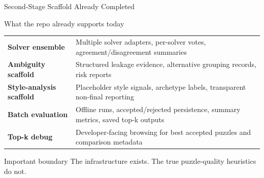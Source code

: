 \documentclass[11pt,aspectratio=169]{beamer}
\begin{document}
\begin{frame}{Second-Stage Scaffold Already Completed}
  \begin{block}{What the repo already supports today}
    \begin{tabularx}{\linewidth}{>{\bfseries}p{3.2cm} X}
      Solver ensemble & Multiple solver adapters, per-solver votes, agreement/disagreement summaries \\
      \addlinespace[4pt]
      Ambiguity scaffold & Structured leakage evidence, alternative grouping records, risk reports \\
      \addlinespace[4pt]
      Style-analysis scaffold & Placeholder style signals, archetype labels, transparent non-final reporting \\
      \addlinespace[4pt]
      Batch evaluation & Offline runs, accepted/rejected persistence, summary metrics, saved top-k outputs \\
      \addlinespace[4pt]
      Top-k debug & Developer-facing browsing for best accepted puzzles and comparison metadata \\
    \end{tabularx}
  \end{block}

  \vspace{0.12cm}
  \begin{alertblock}{Important boundary}
    The infrastructure exists. The true puzzle-quality heuristics do not.
  \end{alertblock}
\end{frame}
\end{document}
